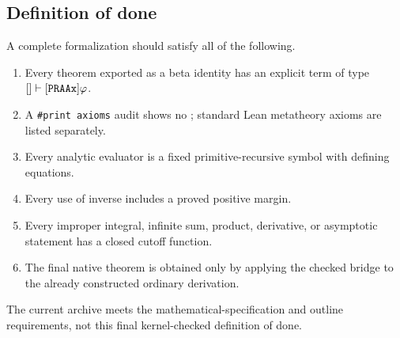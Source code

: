 \subsection{Definition of done}

A complete formalization should satisfy all of the following.

\begin{enumerate}
\item Every theorem exported as a beta identity has an explicit term of type
$[]\vdash[\code{PRAAx}]\varphi$.
\item A \texttt{\#print axioms} audit shows no ; standard Lean metatheory axioms are listed separately.
\item Every analytic evaluator is a fixed primitive-recursive symbol with defining equations.
\item Every use of inverse includes a proved positive margin.
\item Every improper integral, infinite sum, product, derivative, or asymptotic statement has a closed cutoff function.
\item The final native theorem is obtained only by applying the checked
 bridge to the already constructed ordinary derivation.
\end{enumerate}

The current archive meets the mathematical-specification and outline requirements, not this final kernel-checked definition of done.
